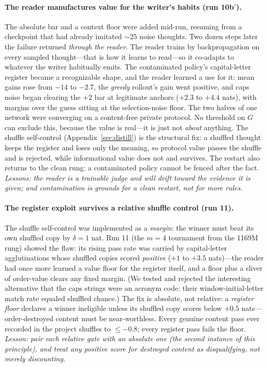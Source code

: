 \documentclass{article} %
\newcommand{\gain}{G}
\begin{document}
\paragraph{The reader manufactures value for the writer's habits (run 10b$'$).} The absolute bar and a context floor were added mid-run, resuming from a checkpoint that had already imitated ${\sim}25$ noise thoughts. Two dozen steps later the failure returned \emph{through the reader}. The reader trains by backpropagation on every sampled thought---that is how it learns to read---so it co-adapts to whatever the writer habitually emits. The contaminated policy's capital-letter register became a recognizable shape, and the reader learned a use for it: mean gains rose from $-14$ to $-2.7$, the \emph{greedy} rollout's gain went positive, and caps noise began clearing the $+2$ bar at legitimate anchors ($+2.3$ to $+4.4$ nats), with margins over the guess sitting at the selection-noise floor. The two halves of one network were converging on a content-free private protocol. No threshold on $\gain$ can exclude this, because the value is real---it is just not \emph{about} anything. The shuffle self-control (Appendix~\ref{sec:distill}) is the structural fix: a shuffled thought keeps the register and loses only the meaning, so protocol value passes the shuffle and is rejected, while informational value does not and survives. The restart also returns to the clean rung: a contaminated policy cannot be fenced after the fact. \emph{Lessons: the reader is a trainable judge and will drift toward the evidence it is given; and contamination is grounds for a clean restart, not for more rules.}

\paragraph{The register exploit survives a relative shuffle control (run 11).} The shuffle self-control was implemented as a \emph{margin}: the winner must beat its own shuffled copy by $\delta = 1$ nat. Run 11 (the $m{=}4$ tournament from the 1169M rung) showed the flaw: its rising pass rate was carried by capital-letter agglutinations whose shuffled copies scored \emph{positive} ($+1$ to $+3.5$ nats)---the reader had once more learned a value floor for the register itself, and a floor plus a sliver of order-value clears any fixed margin. (We tested and rejected the interesting alternative that the caps strings were an acronym code: their window-initial-letter match rate equaled shuffled chance.) The fix is absolute, not relative: a \emph{register floor} declares a winner ineligible unless its shuffled copy scores below $+0.5$ nats---order-destroyed content must be near-worthless. Every genuine content pass ever recorded in the project shuffles to $\le -0.8$; every register pass fails the floor. \emph{Lesson: pair each relative gate with an absolute one (the second instance of this principle), and treat any positive score for destroyed content as disqualifying, not merely discounting.}
\end{document}
